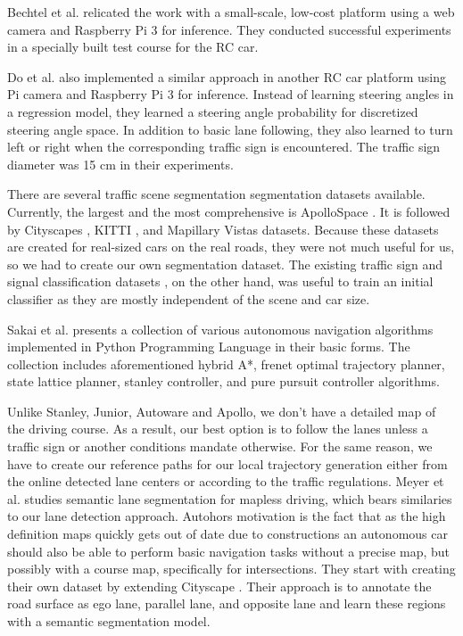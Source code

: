 Bechtel et al. \cite{Bechtel2017DeepPicarAL} relicated the work
\cite{Bojarski2016EndTE} with a small-scale, low-cost platform using a web
camera and Raspberry Pi 3 for inference. They conducted successful experiments
in a specially built test course for the RC car.

Do et al. \cite{Do2018RealTimeSC} also implemented a similar approach in
another RC car platform using Pi camera and Raspberry Pi 3 for inference.
Instead of learning steering angles in a regression model, they learned a
steering angle probability for discretized steering angle space. In addition to
basic lane following, they also learned to turn left or right when the
corresponding traffic sign is encountered. The traffic sign diameter was 15 cm
in their experiments.

There are several traffic scene segmentation segmentation datasets available.
Currently, the largest and the most comprehensive is ApolloSpace
\cite{Huang2018TheAD}. It is followed by Cityscapes \cite{Cordts2016TheCD},
KITTI \cite{Geiger2012AreWR}, and Mapillary Vistas \cite{Neuhold2017TheMV}
datasets. Because these datasets are created for real-sized cars on the real
roads, they were not much useful for us, so we had to create our own
segmentation dataset. The existing traffic sign and signal classification
datasets \cite{Timofte2009MultiviewTS, Stallkamp2012ManVC, Shakhuro2016RussianTS,
Serna2018ClassificationOT, MaldonadoBascn2007RoadSignDA}, on the other hand,
was useful to train an initial classifier as they are mostly independent of the
scene and car size.

Sakai et al. \cite{Kim2013SensorbasedMP} presents a collection of various
autonomous navigation algorithms implemented in Python Programming Language in
their basic forms. The collection includes aforementioned hybrid A*, frenet
optimal trajectory planner, state lattice planner, stanley controller, and pure
pursuit controller algorithms.

Unlike Stanley, Junior, Autoware and Apollo, we don't have a detailed map of
the driving course. As a result, our best option is to follow the lanes unless
a traffic sign or another conditions mandate otherwise. For the same reason, we
have to create our reference paths for our local trajectory generation either
from the online detected lane centers or according to the traffic regulations.
Meyer et al. \cite{Meyer2018DeepSL} studies semantic lane segmentation for
mapless driving, which bears similaries to our lane detection approach.
Autohors motivation is the fact that as the high definition maps quickly gets
out of date due to constructions an autonomous car should also be able to
perform basic navigation tasks without a precise map, but possibly with a
course map, specifically for intersections. They start with creating their own
dataset by extending Cityscape \cite{Cordts2016TheCD}. Their approach is to
annotate the road surface as ego lane, parallel lane, and opposite lane and
learn these regions with a semantic segmentation model.

